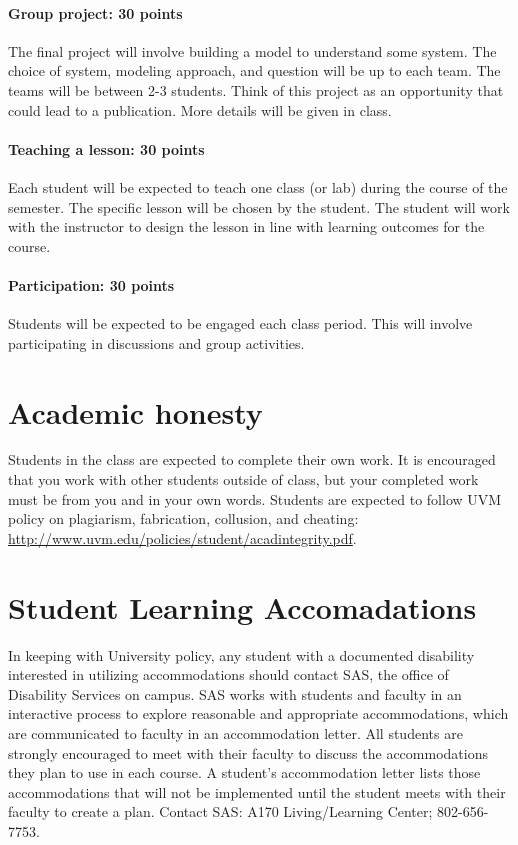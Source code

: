\documentclass[12pt,]{article}
\let\oldparagraph\paragraph
\renewcommand{\paragraph}[1]{\oldparagraph{#1}\mbox{}}
\begin{document}
\paragraph{Group project: 30 points}\label{group-project-30-points}

The final project will involve building a model to understand some
system. The choice of system, modeling approach, and question will be up
to each team. The teams will be between 2-3 students. Think of this
project as an opportunity that could lead to a publication. More details
will be given in class.

\paragraph{Teaching a lesson: 30
points}\label{teaching-a-lesson-30-points}

Each student will be expected to teach one class (or lab) during the
course of the semester. The specific lesson will be chosen by the
student. The student will work with the instructor to design the lesson
in line with learning outcomes for the course.

\paragraph{Participation: 30 points}\label{participation-30-points}

Students will be expected to be engaged each class period. This will
involve participating in discussions and group activities.

\section{Academic honesty}\label{academic-honesty}

Students in the class are expected to complete their own work. It is
encouraged that you work with other students outside of class, but your
completed work must be from you and in your own words. Students are
expected to follow UVM policy on plagiarism, fabrication, collusion, and
cheating: \url{http://www.uvm.edu/policies/student/acadintegrity.pdf}.

\section{Student Learning
Accomadations}\label{student-learning-accomadations}

In keeping with University policy, any student with a documented
disability interested in utilizing accommodations should contact SAS,
the office of Disability Services on campus. SAS works with students and
faculty in an interactive process to explore reasonable and appropriate
accommodations, which are communicated to faculty in an accommodation
letter. All students are strongly encouraged to meet with their faculty
to discuss the accommodations they plan to use in each course. A
student's accommodation letter lists those accommodations that will not
be implemented until the student meets with their faculty to create a
plan. Contact SAS: A170 Living/Learning Center; 802-656-7753.
\end{document}

